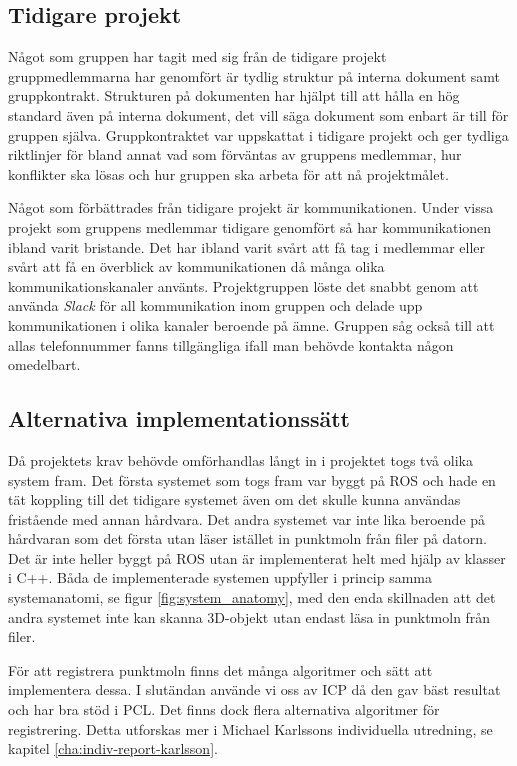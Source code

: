 \subsection{Tidigare projekt}
Något som gruppen har tagit med sig från de tidigare projekt gruppmedlemmarna har genomfört är tydlig struktur på interna dokument samt gruppkontrakt. Strukturen på dokumenten har hjälpt till att hålla en hög standard även på interna dokument, det vill säga dokument som enbart är till för gruppen själva. Gruppkontraktet var uppskattat i tidigare projekt och ger tydliga riktlinjer för bland annat vad som förväntas av gruppens medlemmar, hur konflikter ska lösas och hur gruppen ska arbeta för att nå projektmålet.

Något som förbättrades från tidigare projekt är kommunikationen. Under vissa projekt som gruppens medlemmar tidigare genomfört så har kommunikationen ibland varit bristande. Det har ibland varit svårt att få tag i medlemmar eller svårt att få en överblick av kommunikationen då många olika kommunikationskanaler använts. Projektgruppen löste det snabbt genom att använda \textit{Slack} för all kommunikation inom gruppen och delade upp kommunikationen i olika kanaler beroende på ämne. Gruppen såg också till att allas telefonnummer fanns tillgängliga ifall man behövde kontakta någon omedelbart.


\subsection{Alternativa implementationssätt}
Då projektets krav behövde omförhandlas långt in i projektet togs två olika system fram. Det första systemet som togs fram var byggt på ROS och hade en tät koppling till det tidigare systemet även om det skulle kunna användas fristående med annan hårdvara. Det andra systemet var inte lika beroende på hårdvaran som det första utan läser istället in punktmoln från filer på datorn. Det är inte heller byggt på ROS utan är implementerat helt med hjälp av klasser i C++. Båda de implementerade systemen uppfyller i princip samma systemanatomi, se figur \ref{fig:system_anatomy}, med den enda skillnaden att det andra systemet inte kan skanna 3D-objekt utan endast läsa in punktmoln från filer.

För att registrera punktmoln finns det många algoritmer och sätt att implementera dessa. I slutändan använde vi oss av ICP då den gav bäst resultat och har bra stöd i PCL. Det finns dock flera alternativa algoritmer för registrering. Detta utforskas mer i Michael Karlssons individuella utredning, se kapitel \ref{cha:indiv-report-karlsson}.

